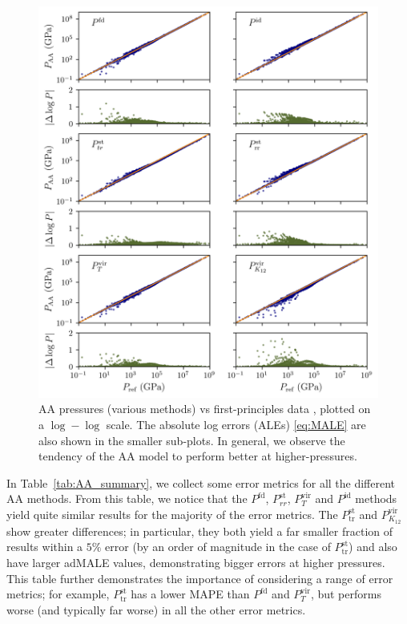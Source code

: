 \documentclass[%
 preprint,
 superscriptaddress,
 amsmath,amssymb,
longbibliography,
]{revtex4-2}
\newcommand{\Pfd}{P^\textrm{fd}}
\newcommand{\Pstrr}{P^\textrm{st}_{rr}}
\newcommand{\Psttr}{P^\textrm{st}_\textrm{tr}}
\newcommand{\Pvirt}{P^\textrm{vir}_T}
\newcommand{\Pvirk}{P^\textrm{vir}_{K_{12}}}
\newcommand{\Pid}{P^\textrm{id}}
\begin{document}
\begin{figure}
    \centering
    \includegraphics{../figs/aa_log_big_v6.png}
    \caption{AA pressures (various methods) vs first-principles data \cite{Militzer_EOS_database}, plotted on a $\log-\log$ scale. The absolute log errors (ALEs) \eqref{eq:MALE} are also shown in the smaller sub-plots. In general, we observe the tendency of the AA model to perform better at higher-pressures.}  
    \label{fig:aa_error_log}
\end{figure}



In Table~\ref{tab:AA_summary}, we collect some error metrics for all the different AA methods. From this table, we notice that the $\Pfd$, $\Pstrr$, $\Pvirt$ and $\Pid$ methods yield quite similar results for the majority of the error metrics. The $\Psttr$ and $\Pvirk$ show greater differences; in particular, they both yield a far smaller fraction of results within a $5\%$ error (by an order of magnitude in the case of $\Psttr$) and also have larger adMALE values, demonstrating bigger errors at higher pressures. This table further demonstrates the importance of considering a range of error metrics; for example, $\Psttr$ has a lower MAPE than $\Pfd$ and $\Pvirt$, but performs worse (and typically far worse) in all the other error metrics. 
\end{document}
